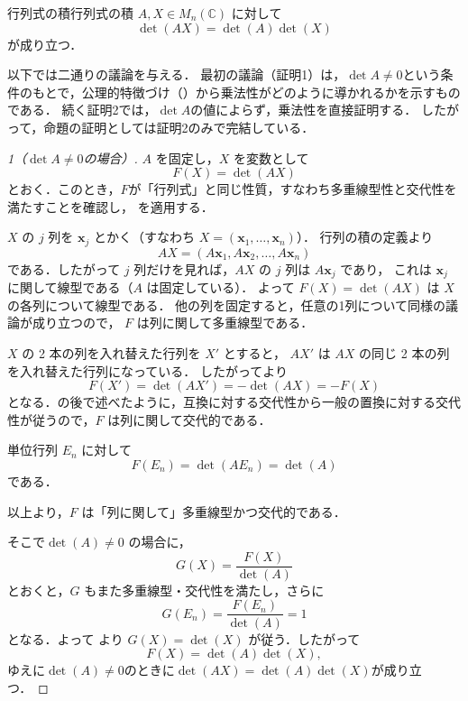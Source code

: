 \begin{prop}{行列式の積}{行列式の積}
  $A, X \in M_n(\mathbb{C})$ に対して
  \[
    \det(AX)=\det(A)\det(X)
  \]
  が成り立つ．
\end{prop}

以下では二通りの議論を与える．
最初の議論（証明1）は，$\det A \ne 0$という条件のもとで，公理的特徴づけ（）から乗法性がどのように導かれるかを示すものである．
続く証明2では，$\det A$の値によらず，乗法性を直接証明する．
したがって，命題の証明としては証明2のみで完結している．

\begin{tleftbar}
\begin{proof}[1（$\det A \ne 0$の場合）]
  $A$ を固定し，$X$ を変数として
  \[
    F(X)=  \det(AX)
  \]
  とおく．このとき，$F$が「行列式」と同じ性質，すなわち多重線型性と交代性を満たすことを確認し，
  を適用する．


  $X$ の $j$ 列を $\bm{x}_j$ とかく（すなわち $X=(\bm{x}_1,\dots,\bm{x}_n)$）．
  行列の積の定義より
  \[
    AX=(A\bm{x}_1,A\bm{x}_2,\dots,A\bm{x}_n)
  \]
  である．したがって $j$ 列だけを見れば，$AX$ の $j$ 列は $A\bm{x}_j$ であり，
  これは $\bm{x}_j$ に関して線型である（$A$ は固定している）．
  よって $F(X)=\det(AX)$ は $X$ の各列について線型である．
他の列を固定すると，任意の1列について同様の議論が成り立つので，
$F$ は列に関して多重線型である．

  $X$ の 2 本の列を入れ替えた行列を $X'$ とすると，
  $AX'$ は $AX$ の同じ 2 本の列を入れ替えた行列になっている．
  したがってより
  \[
    F(X')=\det(AX')=-\det(AX)=-F(X)
  \]
  となる．の後で述べたように，互換に対する交代性から一般の置換に対する交代性が従うので，$F$ は列に関して交代的である．

  単位行列 $E_n$ に対して
  \[
    F(E_n)=\det(AE_n)=\det(A)
  \]
  である．

  以上より，$F$ は「列に関して」多重線型かつ交代的である．

  \smallskip
  そこで$\det(A) \ne 0$ の場合に，
  \[
    G(X) = \frac{F(X)}{\det(A)}
  \]
  とおくと，$G$ もまた多重線型・交代性を満たし，さらに
  \[
    G(E_n)=\frac{F(E_n)}{\det(A)}=1
  \]
  となる．よって より $G(X)=\det(X)$ が従う．したがって
  \[
    F(X)=\det(A)\det(X),
  \]
  ゆえに$\det (A) \ne 0$のときに$\det(AX)=\det(A)\det(X)$が成り立つ．


\end{proof}
\end{tleftbar}
